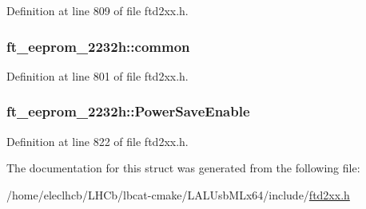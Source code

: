 Definition at line 809 of file ftd2xx.h.\hypertarget{structft__eeprom__2232h_a9b818fef5106306f0fb8456979164d4e}{
\subsubsection[{common}]{ {\bf ft\_\-eeprom\_\-2232h::common}}}
\label{structft__eeprom__2232h_a9b818fef5106306f0fb8456979164d4e}


Definition at line 801 of file ftd2xx.h.\hypertarget{structft__eeprom__2232h_a411dc2831f568c59e7e7eed513254f94}{
\subsubsection[{PowerSaveEnable}]{ {\bf ft\_\-eeprom\_\-2232h::PowerSaveEnable}}}
\label{structft__eeprom__2232h_a411dc2831f568c59e7e7eed513254f94}


Definition at line 822 of file ftd2xx.h.

The documentation for this struct was generated from the following file:\begin{DoxyCompactItemize}
\item 
/home/eleclhcb/LHCb/lbcat-\/cmake/LALUsbMLx64/include/\hyperlink{LALUsbMLx64_2include_2ftd2xx_8h}{ftd2xx.h}\end{DoxyCompactItemize}
